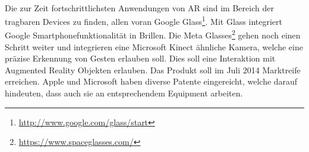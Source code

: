\paragraph{}
Die zur Zeit fortschrittlichsten Anwendungen von AR sind im Bereich der tragbaren Devices zu finden, allen voran Google Glass\footnote{\protect\url{http://www.google.com/glass/start}}. Mit Glass integriert Google Smartphonefunktionalität in Brillen. Die Meta Glasses\footnote{\protect\url{https://www.spaceglasses.com/}} gehen noch einen Schritt weiter und integrieren eine Microsoft Kinect ähnliche Kamera, welche eine präzise Erkennung von Gesten erlauben soll. Dies soll eine Interaktion mit Augmented Reality Objekten erlauben. Das Produkt soll im Juli 2014 Marktreife erreichen. Apple und Microsoft haben diverse Patente eingereicht, welche darauf hindeuten, dass auch sie an entsprechendem Equipment arbeiten.